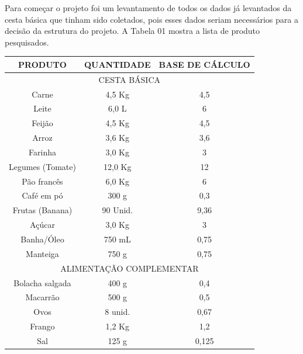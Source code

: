 \documentclass{ifto-tex}
\begin{document}
Para começar o projeto foi um levantamento de todos os dados já levantados da cesta básica que tinham sido coletados, pois esses dados seriam necessários para a decisão da estrutura do projeto. A Tabela 01 mostra a lista de produto pesquisados.
	\begin{longtable}{|c|c|c|} 
			\hline
			PRODUTO           & QUANTIDADE         & BASE DE CÁLCULO \\
			\hline
			\multicolumn{3}{|c|}{CESTA BÁSICA}                         \\
			\hline
			Carne             & 4,5 Kg             & 4,5             \\
			\hline
			Leite             & 6,0 L              & 6               \\
			\hline
			Feijão            & 4,5 Kg             & 4,5             \\
			\hline
			Arroz             & 3,6 Kg             & 3,6             \\
			\hline
			Farinha           & 3,0 Kg             & 3               \\
			\hline
			Legumes (Tomate)  & 12,0 Kg            & 12              \\
			\hline
			Pão francês       & 6,0 Kg             & 6               \\
			\hline
			Café em pó        & 300 g              & 0,3             \\
			\hline
			Frutas (Banana)   & 90 Unid.           & 9,36            \\
			\hline
			Açúcar            & 3,0 Kg             & 3               \\
			\hline
			Banha/Óleo        & 750 mL             & 0,75            \\
			\hline
			Manteiga          & 750 g              & 0,75            \\
			\hline
			\multicolumn{3}{|c|}{ALIMENTAÇÃO COMPLEMENTAR}             \\
			\hline
			Bolacha salgada   & 400 g              & 0,4             \\
			\hline
			Macarrão          & 500 g              & 0,5             \\
			\hline
			Ovos              & 8 unid.            & 0,67            \\
			\hline
			Frango            & 1,2 Kg             & 1,2             \\
			\hline
			Sal               & 125 g              & 0,125           \\

\end{longtable}
\end{document}
